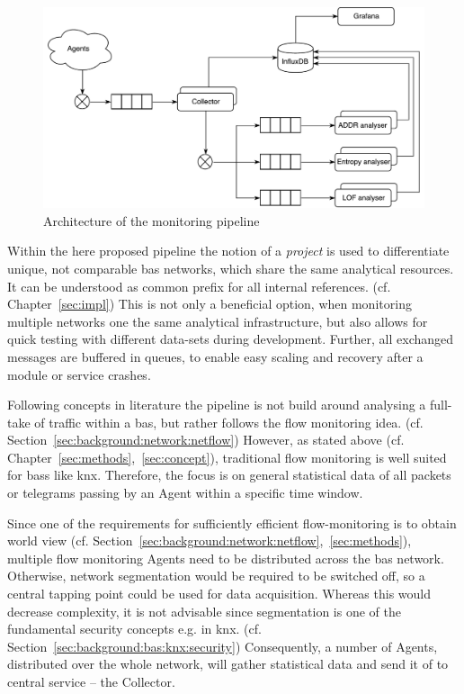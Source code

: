 \begin{figure}[h]
	\centering
	\includegraphics[width=\textwidth]{figures/300-concept-architecture.pdf}
	\caption[Pipeline Architecture]{Architecture of the monitoring pipeline  }
	\label{fig:concept:architecture}
\end{figure}

Within the here proposed pipeline the notion of a \emph{project} is used to differentiate unique, not comparable \gls{bas} networks, which share the same analytical resources. It can be understood as common prefix for all internal references. (cf. Chapter~\ref{sec:impl})
This is not only a beneficial option, when monitoring multiple networks one the same analytical infrastructure, but also allows for quick testing with different data-sets during development.
Further, all exchanged messages are buffered in queues, to enable easy scaling and recovery after a module or service crashes.

Following concepts in literature \parencite[cf.][]{Celeda2012,Pan2014} the pipeline is not build around analysing a full-take of traffic within a \gls{bas}, but rather follows the flow monitoring idea. (cf. Section~\ref{sec:background:network:netflow})
However, as stated above (cf. Chapter~\ref{sec:methods},~\ref{sec:concept}), traditional flow monitoring is well suited for \glspl{bas} like \gls{knx}. Therefore, the focus is on general statistical data of all packets or telegrams passing by an Agent within a specific time window.

Since one of the requirements for sufficiently efficient flow-monitoring is to obtain world view (cf. Section~\ref{sec:background:network:netflow},~\ref{sec:methods}), multiple flow monitoring Agents need to be distributed across the \gls{bas} network. Otherwise, network segmentation would be required to be switched off, so a central tapping point could be used for data acquisition.
Whereas this would decrease complexity, it is not advisable since segmentation is one of the fundamental security concepts e.g. in \gls{knx}. (cf. Section~\ref{sec:background:bas:knx:security})
Consequently, a number of Agents, distributed over the whole network, will gather statistical data and send it of to central service -- the Collector.

